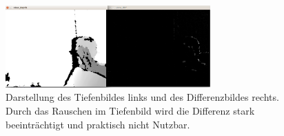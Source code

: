 		\begin{figure}[H]
		\centering
		\includegraphics[width=0.7\textwidth]{../media/depth-diff}
		\caption{Darstellung des Tiefenbildes links und des Differenzbildes rechts. Durch das Rauschen im Tiefenbild wird die Differenz stark beeinträchtigt und praktisch nicht Nutzbar.}
		\label{fig:depth-diff}
		\end{figure}

		

						
